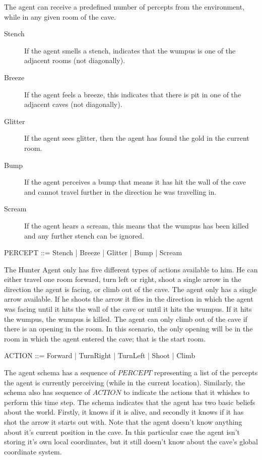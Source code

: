 \documentclass[a4paper]{article}
\begin{document}
The agent can receive a predefined number of percepts from the
environment, while in any given room of the cave.
\begin{description}
	\item[Stench] If the agent smells a stench, indicates that the wumpus 
	is one of the adjacent rooms (not diagonally).
	\item[Breeze] If the agent feels a breeze, this indicates that there
	is pit in one of the adjacent caves (not diagonally).
	\item[Glitter] If the agent sees glitter, then the agent has found
	the gold in the current room.
	\item[Bump] If the agent perceives a bump that means it has hit the
	wall of the cave and cannot travel further in the direction he was
	travelling in.
	\item[Scream] If the agent hears a scream, this means that the
	wumpus has been killed and any further stench can be ignored.
\end{description}
\begin{zed}
	PERCEPT ::= Stench | Breeze | Glitter | Bump | Scream
\end{zed}

The Hunter Agent only has five different types of actions available to
him. He can either travel one room forward, turn left or right, shoot a
single arrow in the direction the agent is facing, or climb out of the
cave. The agent only has a single arrow available. If he shoots the
arrow it flies in the direction in which the agent was facing until it
hits the wall of the cave or until it hits the wumpus. If it hits the
wumpus, the wumpus is killed. The agent can only climb out of the cave
if there is an opening in the room. In this scenario, the only opening
will be in the room in which the agent entered the cave; that is the
start room.
\begin{zed}
	ACTION ::= Forward | TurnRight | TurnLeft | Shoot | Climb
\end{zed}

The agent schema has a sequence of $PERCEPT$ representing a list of the
percepts the agent is currently perceiving (while in the current
location). Similarly, the schema also has sequence of $ACTION$ to
indicate the actions that it whishes to perform this time step.
The schema indicates that the agent has two basic beliefs about the
world. Firstly, it knows if it is alive, and secondly it knows if it has
shot the arrow it starts out with. Note that the agent doesn't know
anything about it's current position in the cave. In this particular
case the agent isn't storing it's own local coordinates, but it still
doesn't know about the cave's global coordinate system.
\end{document}
